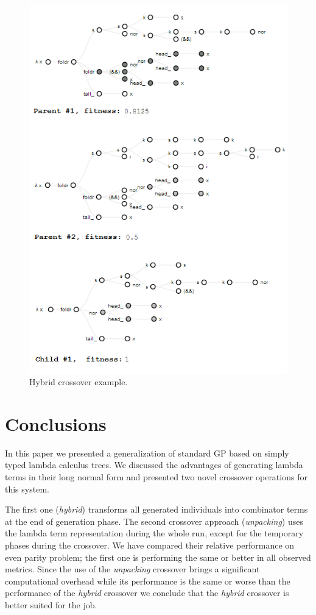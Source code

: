 \documentclass{sig-alternate}
\newcommand{\red}[1]{{\color{red} #1}}
\begin{document}
\begin{figure}[!ht]
  \centering
  \caption{Hybrid crossover example.}
  \includegraphics[scale=0.6]{crossover.png} %
\end{figure}


\section{Conclusions}
\label{conclusions}

In this paper we presented a generalization of standard GP based on simply typed lambda calculus trees. We discussed the advantages of generating lambda terms in their long normal form and presented two novel crossover operations for this system.

The first one (\textit{hybrid}) transforms all generated individuals into combinator terms at the end of generation phase. The second crossover approach (\textit{unpacking}) uses the lambda term representation during the whole run, except for the temporary phases during the crossover. We have compared their relative performance on even parity problem; the first one is performing the same or better in all observed metrics. Since the use of the \textit{unpacking} crossover brings a significant computational overhead while its performance is the same or worse than the performance of the \textit{hybrid} crossover we conclude that 
the \textit{hybrid} crossover is better suited for the job.
\end{document}
